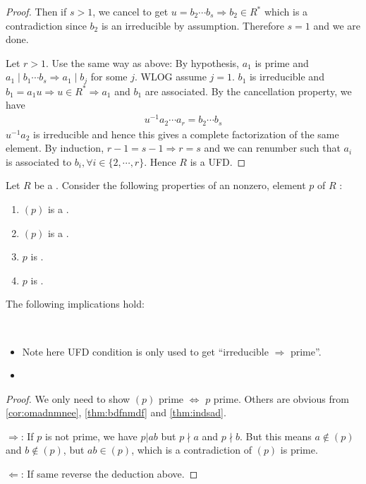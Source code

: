 \documentclass{article}
\begin{document}
\begin{proof}
Then if $s>1$, we cancel to get $u=b_{2} \cdots b_{s} \Rightarrow b_{2} \in R^{*}$ which is a contradiction since $b_{2}$ is an irreducible by assumption. Therefore $s=1$ and we are done.

Let $r>1$. Use the same way as above: By hypothesis, $a_{1}$ is prime and $a_{1}\mid b_{1} \cdots b_{s} \Rightarrow a_{1}\mid b_{j}$ for some $j$. WLOG assume $j=1$. $b_{1}$ is irreducible and $b_{1}=a_{1} u \Rightarrow u \in R^{*} \Rightarrow a_{1}$ and $b_{1}$ are associated.
By the cancellation property, we have
\begin{align*}
u^{-1} a_{2} \cdots a_{r}=b_{2} \cdots b_{s}
\end{align*}
$u^{-1} a_{2}$ is irreducible and hence this gives a complete factorization of the same element. By induction, $r-1=s-1 \Rightarrow r=s$ and we can renumber such that $a_{i}$ is associated to $b_{i}, \forall i \in\{2, \cdots, r\}$. Hence $R$ is a UFD.
\end{proof} 

\begin{cora}\label{cor:omadfa}
 Let $R$ be a . Consider the following properties of an nonzero,  element $p$ of $R$ :
 \begin{enumerate}
     \item $(p)$ is a .
     \item $(p)$ is a .
     \item $p$ is .
     \item $p$ is .
 \end{enumerate}
The following implications hold:

\centerline{}
\end{cora}
\begin{rema}$ $\label{rem:enqreqr}
\begin{itemize}
    \item Note here UFD condition is only used to get ``irreducible $\Rightarrow$ prime''. 
    \item  {}
\end{itemize}
\end{rema}
\begin{proof}
We only need to show $(p)$ prime $\Longleftrightarrow$ $p$ prime. Others are obvious from  \cref{cor:omadnmnee}, \cref{thm:bdfnmdf} and \cref{thm:indsad}.

$\Rightarrow$: If $p$ is not prime, we have $p|ab$ but $p\nmid a$ and $p\nmid b$. But this means $a\notin (p)$ and $b\notin (p)$, but $ab\in (p)$, which is a contradiction of $(p)$ is prime.

$\Leftarrow$: If same reverse the deduction above.
\end{proof}
\end{document}
